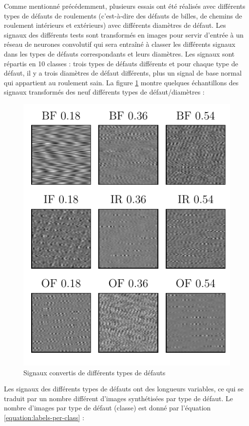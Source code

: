 Comme mentionné précédemment, plusieurs essais ont été réalisés avec différents types de défauts de roulements (c'est-à-dire des défauts de billes, de chemins de roulement intérieurs et extérieurs) avec différents diamètres de défaut. Les signaux des différents tests sont transformés en images pour servir d'entrée à un réseau de neurones convolutif qui sera entraîné à classer les différents signaux dans les types de défauts correspondants et leurs diamètres. Les signaux sont répartis en 10 classes : trois types de défauts différents et pour chaque type de défaut, il y a trois diamètres de défaut différents, plus un signal de base normal qui appartient au roulement sain. La figure \ref{fig:bearings_faults_samples} montre quelques échantillons des signaux transformés des neuf différents types de défaut/diamètres : 

\begin{figure}[h]
    \centering
	\includegraphics{figures/cw_bearings_faults_samples.pdf}
    \caption{Signaux convertis de différents types de défauts}
    \label{fig:bearings_faults_samples}
\end{figure}

Les signaux des différents types de défauts ont des longueurs variables, ce qui se traduit par un nombre différent d'images synthétisées par type de défaut. Le nombre d'images par type de défaut (classe) est donné par l'équation \ref{equation:labels-per-class} :

